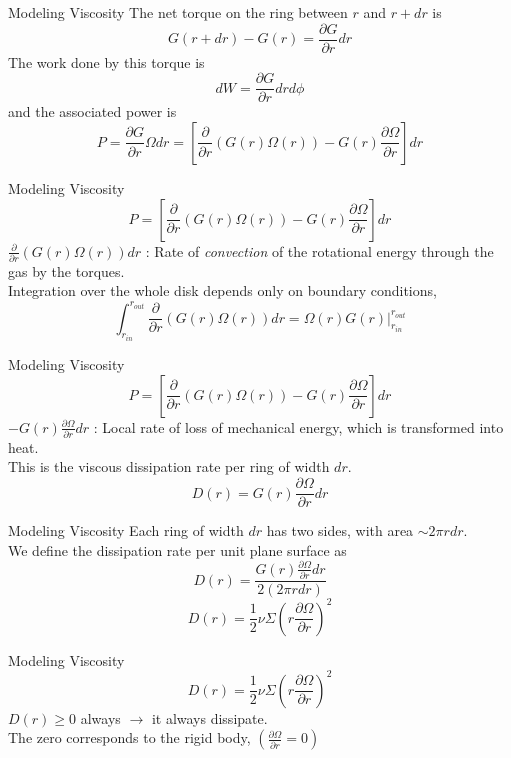 \documentclass{beamer}
\begin{document}
\begin{frame}{Modeling Viscosity}
	The net torque on the ring between $r$ and $r+dr$ is
	\[ G(r+dr)-G(r) = \frac{\partial G}{\partial r} dr\] 
	\pause
	The work done by this torque is	
	\pause
	\[dW = \frac{\partial G}{\partial r} dr d\phi \]
	\pause
	and the associated power is
	\[P = \frac{\partial G}{\partial r} \Omega dr = \left[ \frac{\partial}{\partial r}  \left( G(r) \Omega (r) \right) - G(r) \frac{\partial \Omega}{\partial r}  \right] dr  \]
\end{frame}

\begin{frame}{Modeling Viscosity}
	\[P = \left[ \frac{\partial}{\partial r}  \left( G(r) \Omega (r) \right) - G(r) \frac{\partial \Omega}{\partial r}  \right] dr  \]
	$\frac{\partial}{\partial r}  \left( G(r) \Omega (r) \right) dr$ : Rate of \textit{convection} of the rotational energy through the gas by the torques. \\
	\pause
	Integration over the whole disk depends only on boundary conditions,
	\pause
	\[ \int_{r_{in}} ^{r_{out}} \frac{\partial}{\partial r}  \left( G(r) \Omega (r) \right) dr = \left. \Omega (r) G(r) \right|_{r_{in}} ^{r_{out}}\]
\end{frame}

\begin{frame}{Modeling Viscosity}
	\[P = \left[ \frac{\partial}{\partial r}  \left( G(r) \Omega (r) \right) - G(r) \frac{\partial \Omega}{\partial r}  \right] dr  \]
	$ - G(r) \frac{\partial \Omega}{\partial r} dr$ : Local rate of loss of mechanical energy, which is transformed into heat. \\
	\pause
	This is the viscous dissipation rate per ring of width $dr$.
	\pause
	\[ D(r) = G(r) \frac{\partial \Omega}{\partial r} dr\]
\end{frame}

\begin{frame}{Modeling Viscosity}
	Each ring of width $dr$ has two sides, with area $\sim 2\pi r dr$.\\
	\pause
	We define the dissipation rate per unit plane surface as
	\[ D(r) = \frac{ G(r) \frac{\partial \Omega}{\partial r} dr }{2 (2\pi r dr)}\]
	\pause
	\[D(r) = \frac{1}{2} \nu \Sigma \left( r \frac{\partial \Omega}{\partial r} \right)^2 \]
\end{frame}

\begin{frame}{Modeling Viscosity}
	\[D(r) = \frac{1}{2} \nu \Sigma \left( r \frac{\partial \Omega}{\partial r} \right)^2 \]
	\pause
	$D(r)\geq 0$ always $\rightarrow$ it always dissipate.\\
	\pause
	The zero corresponds to the rigid body, $\left( \frac{\partial \Omega}{\partial r}  = 0 \right)$
\end{frame}
\end{document}
